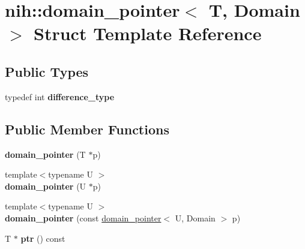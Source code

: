 \hypertarget{structnih_1_1domain__pointer}{
\section{nih\-:\-:domain\-\_\-pointer$<$ \-T, \-Domain $>$ \-Struct \-Template \-Reference}
\label{structnih_1_1domain__pointer}
}
\subsection*{\-Public \-Types}
\begin{DoxyCompactItemize}
\item 
\hypertarget{structnih_1_1domain__pointer_a2886fd1032087829835fdfd5a8e0e6a7}{
typedef int {\bfseries difference\-\_\-type}}
\label{structnih_1_1domain__pointer_a2886fd1032087829835fdfd5a8e0e6a7}

\end{DoxyCompactItemize}
\subsection*{\-Public \-Member \-Functions}
\begin{DoxyCompactItemize}
\item 
\hypertarget{structnih_1_1domain__pointer_a5490cf9cba5f287182acc9c3f9080aff}{
{\bfseries domain\-\_\-pointer} (\-T $\ast$p)}
\label{structnih_1_1domain__pointer_a5490cf9cba5f287182acc9c3f9080aff}

\item 
\hypertarget{structnih_1_1domain__pointer_a275e7bbac9febf79f36ab89091d5e2db}{
{\footnotesize template$<$typename U $>$ }\\{\bfseries domain\-\_\-pointer} (\-U $\ast$p)}
\label{structnih_1_1domain__pointer_a275e7bbac9febf79f36ab89091d5e2db}

\item 
\hypertarget{structnih_1_1domain__pointer_a93b07dd4561312ee8bd8540578913136}{
{\footnotesize template$<$typename U $>$ }\\{\bfseries domain\-\_\-pointer} (const \hyperlink{structnih_1_1domain__pointer}{domain\-\_\-pointer}$<$ \-U, \-Domain $>$ p)}
\label{structnih_1_1domain__pointer_a93b07dd4561312ee8bd8540578913136}

\item 
\hypertarget{structnih_1_1domain__pointer_aebf3be648df1672e75d8b0f33b7236ac}{
\-T $\ast$ {\bfseries ptr} () const }
\label{structnih_1_1domain__pointer_aebf3be648df1672e75d8b0f33b7236ac}

\end{DoxyCompactItemize}
